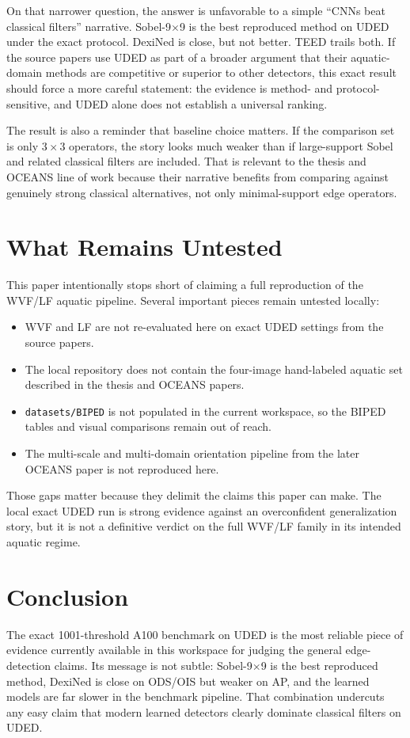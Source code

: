 \documentclass[conference]{IEEEtran}
\begin{document}
On that narrower question, the answer is unfavorable to a simple ``CNNs beat classical filters'' narrative. Sobel-9$\times$9 is the best reproduced method on UDED under the exact protocol. DexiNed is close, but not better. TEED trails both. If the source papers use UDED as part of a broader argument that their aquatic-domain methods are competitive or superior to other detectors, this exact result should force a more careful statement: the evidence is method- and protocol-sensitive, and UDED alone does not establish a universal ranking.

The result is also a reminder that baseline choice matters. If the comparison set is only $3{\times}3$ operators, the story looks much weaker than if large-support Sobel and related classical filters are included. That is relevant to the thesis and OCEANS line of work because their narrative benefits from comparing against genuinely strong classical alternatives, not only minimal-support edge operators.

\section{What Remains Untested}
This paper intentionally stops short of claiming a full reproduction of the WVF/LF aquatic pipeline. Several important pieces remain untested locally:
\begin{itemize}
  \item WVF and LF are not re-evaluated here on exact UDED settings from the source papers.
  \item The local repository does not contain the four-image hand-labeled aquatic set described in the thesis and OCEANS papers.
  \item \texttt{datasets/BIPED} is not populated in the current workspace, so the BIPED tables and visual comparisons remain out of reach.
  \item The multi-scale and multi-domain orientation pipeline from the later OCEANS paper is not reproduced here.
\end{itemize}

Those gaps matter because they delimit the claims this paper can make. The local exact UDED run is strong evidence against an overconfident generalization story, but it is not a definitive verdict on the full WVF/LF family in its intended aquatic regime.

\section{Conclusion}
The exact 1001-threshold A100 benchmark on UDED is the most reliable piece of evidence currently available in this workspace for judging the general edge-detection claims. Its message is not subtle: Sobel-9$\times$9 is the best reproduced method, DexiNed is close on ODS/OIS but weaker on AP, and the learned models are far slower in the benchmark pipeline. That combination undercuts any easy claim that modern learned detectors clearly dominate classical filters on UDED.
\end{document}
